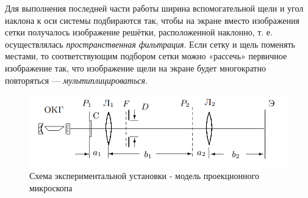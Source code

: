 \documentclass[12pt]{article}
\begin{document}
	
	Для выполнения последней части работы ширина вспомогательной
	щели
	и угол наклона
	к оси системы подбираются так, чтобы на экране
	вместо изображения сетки получалось изображение решётки, расположенной наклонно, т. е. осуществлялась \textit{пространственная фильтрация}.
	Если сетку
	и щель поменять местами, то соответствующим подбором сетки можно «рассечь» первичное изображение так, что изображение щели
	на экране будет многократно повторяться
	— \textit{мультиплицироваться}.
	\begin{figure}
		\centering
		\includegraphics{4}
		\caption{Схема экспериментальной установки - модель проекционного микроскопа}
		\label{fig::exp}
	\end{figure}
\end{document}
